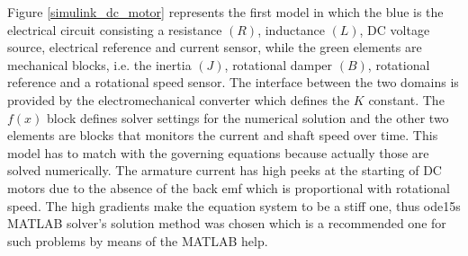 \documentclass[12pt,english,twoside]{article}
\begin{document}
Figure \ref{simulink_dc_motor} represents the first model in which the blue is the electrical circuit consisting a resistance $(R)$, inductance $(L)$, DC voltage source, electrical reference and current sensor, while the green elements are mechanical blocks, i.e. the inertia $(J)$, rotational damper $(B)$, rotational reference and a rotational speed sensor. The interface between the two domains is provided by the electromechanical converter which defines the $K$ constant. The $f(x)$ block defines solver settings for the numerical solution and the other two elements are blocks that monitors the current and shaft speed over time. This model has to match with the governing equations because actually those are solved numerically. The armature current has high peeks at the starting of DC motors due to the absence of the back emf which is proportional with rotational speed. The high gradients make the equation system to be a stiff one, thus ode15s MATLAB solver's solution method was chosen which is a recommended one for such problems by means of the MATLAB help.
\end{document}
